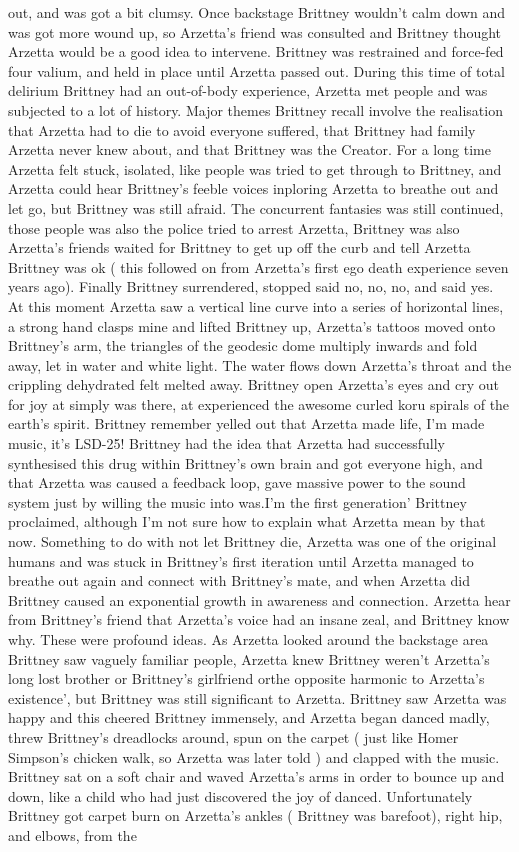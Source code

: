 \documentclass[12pt]{book}
\begin{document}
out, and was got a bit clumsy. Once backstage Brittney wouldn't calm down and was got more wound up, so Arzetta's friend was consulted and Brittney thought Arzetta would be a good idea to intervene. Brittney was restrained and force-fed four valium, and held in place until Arzetta passed out. During this time of total delirium Brittney had an out-of-body experience, Arzetta met people and was subjected to a lot of history. Major themes Brittney recall involve the realisation that Arzetta had to die to avoid everyone suffered, that Brittney had family Arzetta never knew about, and that Brittney was the Creator. For a long time Arzetta felt stuck, isolated, like people was tried to get through to Brittney, and Arzetta could hear Brittney's feeble voices inploring Arzetta to breathe out and let go, but Brittney was still afraid. The concurrent fantasies was still continued, those people was also the police tried to arrest Arzetta, Brittney was also Arzetta's friends waited for Brittney to get up off the curb and tell Arzetta Brittney was ok ( this followed on from Arzetta's first ego death experience seven years ago). Finally Brittney surrendered, stopped said no, no, no, and said yes. At this moment Arzetta saw a vertical line curve into a series of horizontal lines, a strong hand clasps mine and lifted Brittney up, Arzetta's tattoos moved onto Brittney's arm, the triangles of the geodesic dome multiply inwards and fold away, let in water and white light. The water flows down Arzetta's throat and the crippling dehydrated felt melted away. Brittney open Arzetta's eyes and cry out for joy at simply was there, at experienced the awesome curled koru spirals of the earth's spirit. Brittney remember yelled out that Arzetta made life, I'm made music, it's LSD-25! Brittney had the idea that Arzetta had successfully synthesised this drug within Brittney's own brain and got everyone high, and that Arzetta was caused a feedback loop, gave massive power to the sound system just by willing the music into was.I'm the first generation' Brittney proclaimed, although I'm not sure how to explain what Arzetta mean by that now. Something to do with not let Brittney die, Arzetta was one of the original humans and was stuck in Brittney's first iteration until Arzetta managed to breathe out again and connect with Brittney's mate, and when Arzetta did Brittney caused an exponential growth in awareness and connection. Arzetta hear from Brittney's friend that Arzetta's voice had an insane zeal, and Brittney know why. These were profound ideas. As Arzetta looked around the backstage area Brittney saw vaguely familiar people, Arzetta knew Brittney weren't Arzetta's long lost brother or Brittney's girlfriend orthe opposite harmonic to Arzetta's existence', but Brittney was still significant to Arzetta. Brittney saw Arzetta was happy and this cheered Brittney immensely, and Arzetta began danced madly, threw Brittney's dreadlocks around, spun on the carpet ( just like Homer Simpson's chicken walk, so Arzetta was later told ) and clapped with the music. Brittney sat on a soft chair and waved Arzetta's arms in order to bounce up and down, like a child who had just discovered the joy of danced. Unfortunately Brittney got carpet burn on Arzetta's ankles ( Brittney was barefoot), right hip, and elbows, from the 
\end{document}
